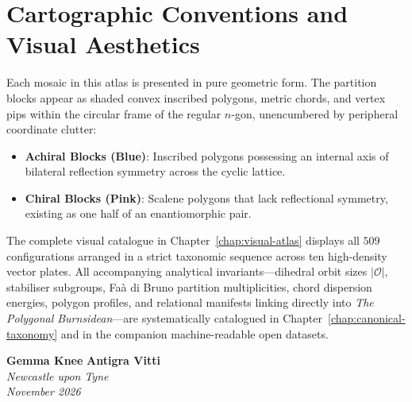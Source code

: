 \section*{Cartographic Conventions and Visual Aesthetics}

Each mosaic in this atlas is presented in pure geometric form. The partition blocks appear as shaded convex inscribed polygons, metric chords, and vertex pips within the circular frame of the regular $n$-gon, unencumbered by peripheral coordinate clutter:
\begin{itemize}
    \item \textbf{Achiral Blocks (Blue)}: Inscribed polygons possessing an internal axis of bilateral reflection symmetry across the cyclic lattice.
    \item \textbf{Chiral Blocks (Pink)}: Scalene polygons that lack reflectional symmetry, existing as one half of an enantiomorphic pair.
\end{itemize}

The complete visual catalogue in Chapter~\ref{chap:visual-atlas} displays all $509$ configurations arranged in a strict taxonomic sequence across ten high-density vector plates. All accompanying analytical invariants---dihedral orbit sizes $|\mathcal{O}|$, stabiliser subgroups, Fa\`a di Bruno partition multiplicities, chord dispersion energies, polygon profiles, and relational manifests linking directly into \emph{The Polygonal Burnsidean}---are systematically catalogued in Chapter~\ref{chap:canonical-taxonomy} and in the companion machine-readable open datasets.

\bigskip
\begin{flushright}
\textbf{Gemma Knee} \qquad \textbf{Antigra Vitti} \\
\emph{Newcastle upon Tyne} \\
\emph{November 2026}
\end{flushright}
